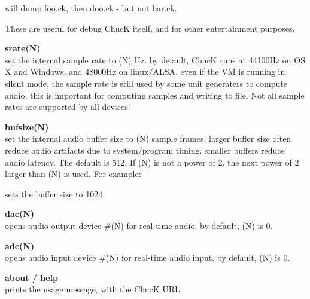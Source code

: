 will dump foo.ck, then doo.ck - but not bar.ck. 

These are useful for debug ChucK itself, and for other entertainment purposes. 

{\bf \doubledash srate(N)}\\
set the internal sample rate to (N) Hz. by default,  ChucK runs at 44100Hz on OS X and Windows, and 48000Hz on linux/ALSA. even if the VM is running in \doubledash silent mode, the sample rate is still used by some unit generaters to compute audio, this is important for computing samples and writing to file. Not all sample rates are supported by all devices! 

{\bf \doubledash bufsize(N)}\\
set the internal audio buffer size to (N) sample frames. larger buffer size often reduce audio artifacts due to system/program timing. smaller buffers reduce audio latency. The default is 512. If (N) is not a power of 2, the next power of 2 larger than (N) is used. For example: 


sets the buffer size to 1024. 

{\bf \doubledash dac(N)}\\
opens audio output device \#(N) for real-time audio. by default,  (N) is 0. 

{\bf \doubledash adc(N)}\\
opens audio input device \#(N) for real-time audio input. by default, (N) is 0. 

{\bf \doubledash about / \doubledash help}\\
prints the usage message, with the ChucK URL

